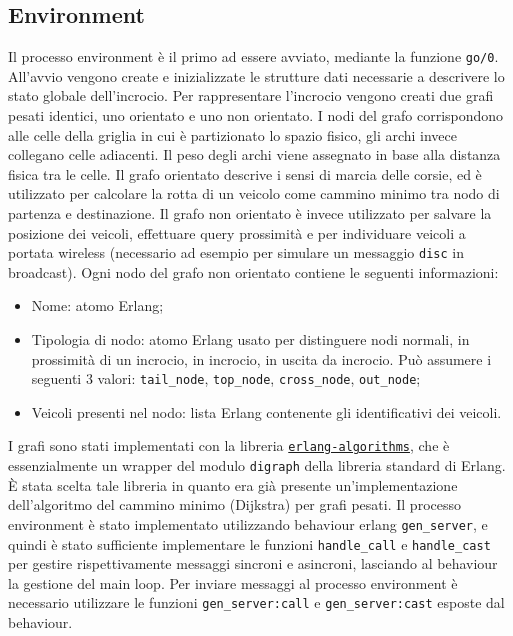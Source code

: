 \documentclass{memoir}
\begin{document}
\subsection{Environment}
Il processo environment è il primo ad essere avviato, mediante la funzione
\texttt{go/0}. All'avvio vengono create e inizializzate le strutture dati
necessarie a descrivere lo stato globale dell'incrocio. Per rappresentare
l'incrocio vengono creati due grafi pesati identici, uno orientato e uno non
orientato. I nodi del grafo corrispondono alle celle della griglia in cui è
partizionato lo spazio fisico, gli archi invece collegano celle adiacenti. Il
peso degli archi viene assegnato in base alla distanza fisica tra le celle. Il
grafo orientato descrive i sensi di marcia delle corsie, ed è utilizzato per
calcolare la rotta di un veicolo come cammino minimo tra nodo di partenza e
destinazione. Il grafo non orientato è invece utilizzato per salvare la
posizione dei veicoli, effettuare query prossimità e per individuare veicoli a
portata wireless (necessario ad esempio per simulare un messaggio \texttt{disc}
in broadcast). Ogni nodo del grafo non orientato contiene le seguenti
informazioni:
\begin{itemize}
\item Nome: atomo Erlang;
\item Tipologia di nodo: atomo Erlang usato per distinguere nodi normali, in
  prossimità di un incrocio, in incrocio, in uscita da incrocio. Può assumere i
  seguenti 3 valori: \texttt{tail\_node}, \texttt{top\_node},
  \texttt{cross\_node}, \texttt{out\_node};
\item Veicoli presenti nel nodo: lista Erlang contenente gli identificativi dei
  veicoli.
\end{itemize}
I grafi sono stati implementati con la libreria
\href{https://github.com/aggelgian/erlang-algorithms}{\texttt{erlang-algorithms}},
che è essenzialmente un wrapper del modulo \texttt{digraph} della libreria
standard di Erlang. È stata scelta tale libreria in quanto era già presente
un'implementazione dell'algoritmo del cammino minimo (Dijkstra) per grafi
pesati. Il processo environment è stato implementato utilizzando behaviour
erlang \texttt{gen\_server}, e quindi è stato sufficiente implementare le
funzioni \texttt{handle\_call} e \texttt{handle\_cast} per gestire
rispettivamente messaggi sincroni e asincroni, lasciando al behaviour la
gestione del main loop. Per inviare messaggi al processo environment è
necessario utilizzare le funzioni \texttt{gen\_server:call} e
\texttt{gen\_server:cast} esposte dal behaviour.
\end{document}
